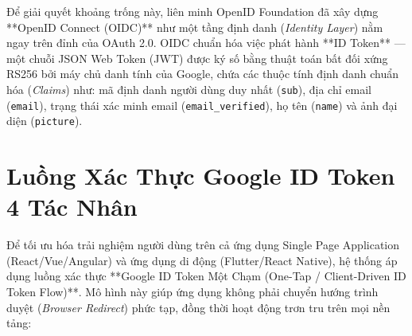 \documentclass[12pt,a4paper,oneside]{book}
\begin{document}
Để giải quyết khoảng trống này, liên minh OpenID Foundation đã xây dựng **OpenID Connect (OIDC)** như một tầng định danh (\textit{Identity Layer}) nằm ngay trên đỉnh của OAuth 2.0. OIDC chuẩn hóa việc phát hành **ID Token** --- một chuỗi JSON Web Token (JWT) được ký số bằng thuật toán bất đối xứng RS256 bởi máy chủ danh tính của Google, chứa các thuộc tính định danh chuẩn hóa (\textit{Claims}) như: mã định danh người dùng duy nhất (\texttt{sub}), địa chỉ email (\texttt{email}), trạng thái xác minh email (\texttt{email\_verified}), họ tên (\texttt{name}) và ảnh đại diện (\texttt{picture}).

\section{Luồng Xác Thực Google ID Token 4 Tác Nhân}
Để tối ưu hóa trải nghiệm người dùng trên cả ứng dụng Single Page Application (React/Vue/Angular) và ứng dụng di động (Flutter/React Native), hệ thống áp dụng luồng xác thực **Google ID Token Một Chạm (One-Tap / Client-Driven ID Token Flow)**. Mô hình này giúp ứng dụng không phải chuyển hướng trình duyệt (\textit{Browser Redirect}) phức tạp, đồng thời hoạt động trơn tru trên mọi nền tảng:
\end{document}
